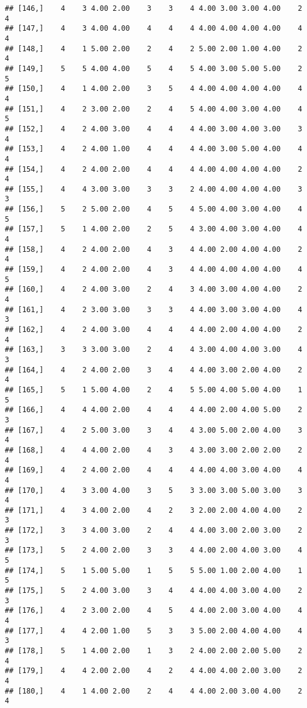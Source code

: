 \documentclass[]{article}
\begin{document}
\begin{verbatim}
## [146,]    4    3 4.00 2.00    3    3    4 4.00 3.00 3.00 4.00    2    4
## [147,]    4    3 4.00 4.00    4    4    4 4.00 4.00 4.00 4.00    4    4
## [148,]    4    1 5.00 2.00    2    4    2 5.00 2.00 1.00 4.00    2    4
## [149,]    5    5 4.00 4.00    5    4    5 4.00 3.00 5.00 5.00    2    5
## [150,]    4    1 4.00 2.00    3    5    4 4.00 4.00 4.00 4.00    4    4
## [151,]    4    2 3.00 2.00    2    4    5 4.00 4.00 3.00 4.00    4    5
## [152,]    4    2 4.00 3.00    4    4    4 4.00 3.00 4.00 3.00    3    4
## [153,]    4    2 4.00 1.00    4    4    4 4.00 3.00 5.00 4.00    4    4
## [154,]    4    2 4.00 2.00    4    4    4 4.00 4.00 4.00 4.00    2    4
## [155,]    4    4 3.00 3.00    3    3    2 4.00 4.00 4.00 4.00    3    3
## [156,]    5    2 5.00 2.00    4    5    4 5.00 4.00 3.00 4.00    4    5
## [157,]    5    1 4.00 2.00    2    5    4 3.00 4.00 3.00 4.00    4    4
## [158,]    4    2 4.00 2.00    4    3    4 4.00 2.00 4.00 4.00    2    4
## [159,]    4    2 4.00 2.00    4    3    4 4.00 4.00 4.00 4.00    4    5
## [160,]    4    2 4.00 3.00    2    4    3 4.00 3.00 4.00 4.00    2    4
## [161,]    4    2 3.00 3.00    3    3    4 4.00 3.00 3.00 4.00    4    3
## [162,]    4    2 4.00 3.00    4    4    4 4.00 2.00 4.00 4.00    2    4
## [163,]    3    3 3.00 3.00    2    4    4 3.00 4.00 4.00 3.00    4    3
## [164,]    4    2 4.00 2.00    3    4    4 4.00 3.00 2.00 4.00    2    4
## [165,]    5    1 5.00 4.00    2    4    5 5.00 4.00 5.00 4.00    1    5
## [166,]    4    4 4.00 2.00    4    4    4 4.00 2.00 4.00 5.00    2    3
## [167,]    4    2 5.00 3.00    3    4    4 3.00 5.00 2.00 4.00    3    4
## [168,]    4    4 4.00 2.00    4    3    4 3.00 3.00 2.00 2.00    2    4
## [169,]    4    2 4.00 2.00    4    4    4 4.00 4.00 3.00 4.00    4    4
## [170,]    4    3 3.00 4.00    3    5    3 3.00 3.00 5.00 3.00    3    4
## [171,]    4    3 4.00 2.00    4    2    3 2.00 2.00 4.00 4.00    2    3
## [172,]    3    3 4.00 3.00    2    4    4 4.00 3.00 2.00 3.00    2    3
## [173,]    5    2 4.00 2.00    3    3    4 4.00 2.00 4.00 3.00    4    5
## [174,]    5    1 5.00 5.00    1    5    5 5.00 1.00 2.00 4.00    1    5
## [175,]    5    2 4.00 3.00    3    4    4 4.00 4.00 3.00 4.00    2    3
## [176,]    4    2 3.00 2.00    4    5    4 4.00 2.00 3.00 4.00    4    4
## [177,]    4    4 2.00 1.00    5    3    3 5.00 2.00 4.00 4.00    4    3
## [178,]    5    1 4.00 2.00    1    3    2 4.00 2.00 2.00 5.00    2    4
## [179,]    4    4 2.00 2.00    4    2    4 4.00 4.00 2.00 3.00    2    4
## [180,]    4    1 4.00 2.00    2    4    4 4.00 2.00 3.00 4.00    2    4

\end{verbatim}
\end{document}
